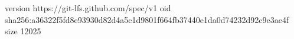 version https://git-lfs.github.com/spec/v1
oid sha256:a36322f5fd8e93930d82d4a5c1d9801f664fb37440e1da0d74232d92c9e3ae4f
size 12025
